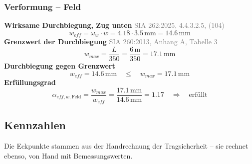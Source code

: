 \documentclass[11pt,a4paper]{article}
\newcommand{\normref}[1]{{\small\textcolor{gray}{#1}}}
\begin{document}
\subsubsection{Verformung – Feld}
\noindent\textbf{Wirksame Durchbiegung, Zug unten} \hfill \normref{SIA 262:2025, 4.4.3.2.5, (104)}
\begin{equation*}
w_{eff} = \omega_w \cdot w = 4.18 \cdot 3.5\,\mathrm{mm} = 14.6\,\mathrm{mm}
\end{equation*}
\noindent\textbf{Grenzwert der Durchbiegung} \hfill \normref{SIA 260:2013, Anhang A, Tabelle 3}
\begin{equation*}
w_{max} = \frac{L}{350} = \frac{6\,\mathrm{m}}{350} = 17.1\,\mathrm{mm}
\end{equation*}
\noindent\textbf{Durchbiegung gegen Grenzwert}
\begin{equation*}
w_{eff} = 14.6\,\mathrm{mm} \quad \le \quad w_{max} = 17.1\,\mathrm{mm}
\end{equation*}
\noindent\textbf{Erfüllungsgrad}
\begin{equation*}
\alpha_{eff,w,\text{Feld}} = \frac{w_{max}}{w_{eff}} = \frac{17.1\,\mathrm{mm}}{14.6\,\mathrm{mm}} = 1.17 \quad \Rightarrow \quad \text{erfüllt}
\end{equation*}
\subsection{Kennzahlen}
Die Eckpunkte stammen aus der Handrechnung der Tragsicherheit – sie rechnet ebenso, von Hand mit Bemessungswerten.
\end{document}
